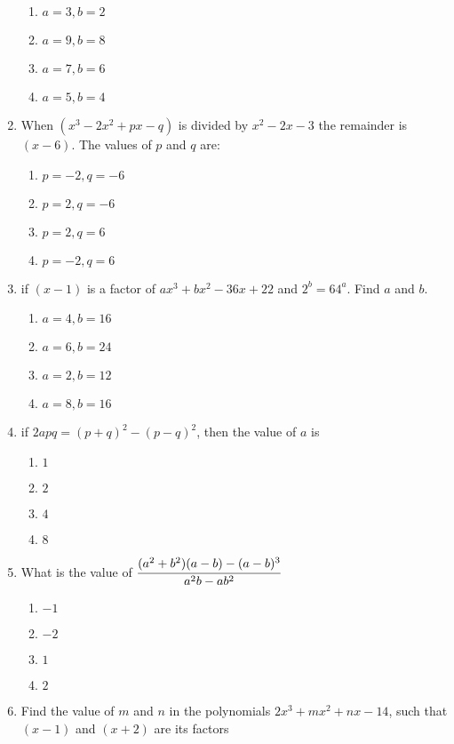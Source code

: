 \begin{multicols}{2}
\begin{enumerate}[label={\arabic*.}]
	\begin{enumerate}[label={\Alph*.}]
	\item \(a= 3, b =2\)
	\item \(a=9, b=8\)
	\item \(a=7, b =6\)
	\item \(a=5,b=4\)
	\end{enumerate}
\item When $(x^3 - 2x^2 + px -q)$ is divided by $x^2 - 2x -3$ the remainder is $(x-6)$. The values of $p$ and $q$ are: 
	\begin{enumerate}[label={\Alph*.}]
	\item \(p = -2, q = -6\)
	\item \(p = 2, q = -6\)
	\item \(p = 2, q = 6\)
	\item \(p = -2, q = 6\)
	\end{enumerate}
\item if $(x-1)$ is a factor of $ax^3 + bx^2 -36x + 22$ and $2^b = 64^a$. Find $a$ and $b$.
	\begin{enumerate}[label={\Alph*.}]
	\item \(a= 4, b =16\)
	\item \(a = 6, b =24\)
	\item \(a = 2, b =12\)
	\item \(a = 8, b = 16\)
	\end{enumerate}
\item if $2apq = (p+q)^2 - (p-q)^2$, then the value of $a$ is 
	\begin{enumerate}[label={\Alph*.}]
	\item \(1\)
	\item \(2\)
	\item \(4\)
	\item \(8\)
	\end{enumerate}
\item What is the value of $\cfrac{(a^2 + b^2)(a-b) - (a-b)^3}{a^2b - ab^2}$
	\begin{enumerate}[label={\Alph*.}]
	\item \(-1\)
	\item \(-2\)
	\item \(1\)
	\item \(2\)
	\end{enumerate}
\item Find the value of $m$ and $n$ in the polynomials $2x^3 + mx^2 + nx -14$, such that $(x-1)$ and $(x+2)$ are its factors
	\begin{enumerate}[label={\Alph*.}]

\end{enumerate}
\end{enumerate}
\end{multicols}
